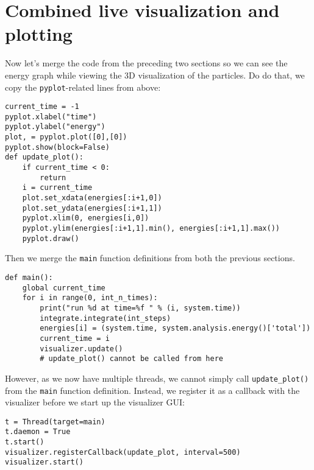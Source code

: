 \documentclass[
paper=a4,                       %
fontsize=11pt,                  %
twoside,                        %
footsepline,                    %
headsepline,                    %
headinclude=false,              %
footinclude=false,              %
pagesize,                       %
]{scrartcl}
\begin{document}
\section{Combined live visualization and plotting}

Now let's merge the code from the preceding two sections so we can see the energy graph while viewing the 3D visualization of the particles.
Do do that, we copy the \lstinline{pyplot}-related lines from above:
\begin{lstlisting}
current_time = -1
pyplot.xlabel("time")
pyplot.ylabel("energy")
plot, = pyplot.plot([0],[0])
pyplot.show(block=False)
def update_plot():
    if current_time < 0:
        return
    i = current_time
    plot.set_xdata(energies[:i+1,0])
    plot.set_ydata(energies[:i+1,1])
    pyplot.xlim(0, energies[i,0])
    pyplot.ylim(energies[:i+1,1].min(), energies[:i+1,1].max())
    pyplot.draw()
\end{lstlisting}
Then we merge the \lstinline{main} function definitions from both the previous sections.
\begin{lstlisting}
def main():
    global current_time
    for i in range(0, int_n_times):
        print("run %d at time=%f " % (i, system.time))
        integrate.integrate(int_steps)
        energies[i] = (system.time, system.analysis.energy()['total'])
        current_time = i
        visualizer.update()
        # update_plot() cannot be called from here
\end{lstlisting}
However, as we now have multiple threads, we cannot simply call \lstinline{update_plot()} from the \lstinline{main} function definition.
Instead, we register it as a callback with the visualizer before we start up the visualizer GUI:
\begin{lstlisting}
t = Thread(target=main)
t.daemon = True
t.start()
visualizer.registerCallback(update_plot, interval=500)
visualizer.start()
\end{lstlisting}
\end{document}
